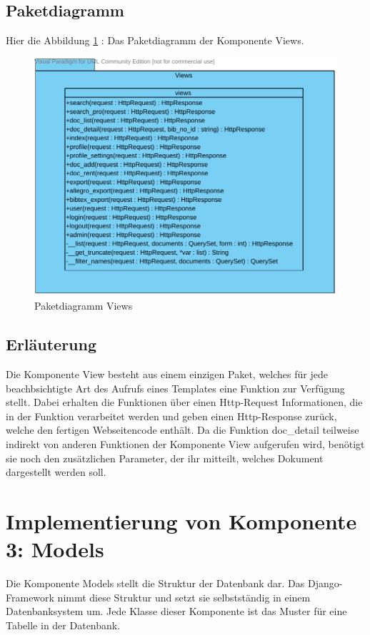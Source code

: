 \subsection{Paketdiagramm}
Hier die Abbildung \ref{fig:PDviews} : Das Paketdiagramm der Komponente Views.
\begin{figure}[H]
\includegraphics[width=0.8\linewidth]{bilder/Paketdiagramm_views.pdf}
\caption{Paketdiagramm Views}
\label{fig:PDviews}
\end{figure}
\subsection{Erl\"auterung}
Die Komponente View besteht aus einem einzigen Paket, welches für jede
beachbsichtigte Art des Aufrufs eines Templates eine Funktion zur Verfügung
stellt. Dabei erhalten die Funktionen über einen Http-Request Informationen, die
in der Funktion verarbeitet werden und geben einen Http-Response zurück, welche
den fertigen Webseitencode enthält. Da die Funktion doc\_detail
teilweise indirekt von anderen Funktionen der Komponente View aufgerufen wird,
benötigt sie noch den zusätzlichen Parameter, der ihr mitteilt, welches Dokument
dargestellt werden soll.


\section{Implementierung von Komponente
         3: Models}


Die Komponente Models stellt die Struktur der Datenbank dar. Das
Django-Framework nimmt diese Struktur und setzt sie selbstständig in einem
Datenbanksystem um. Jede Klasse dieser Komponente ist das Muster für eine
Tabelle in der Datenbank.

